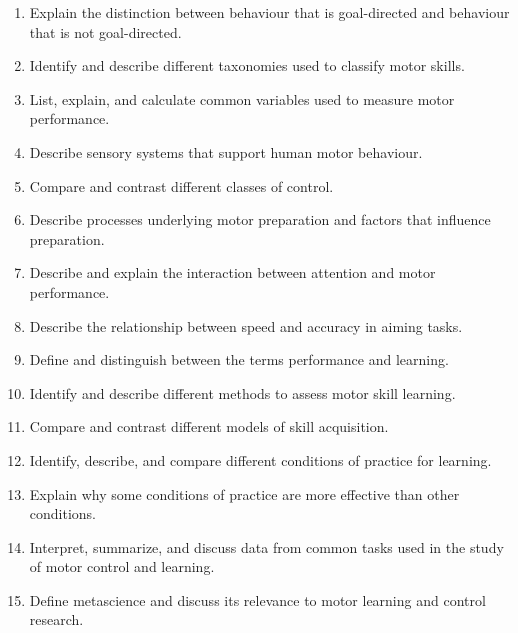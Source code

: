 \documentclass[hidelinks,11pt]{article}
\begin{document}
\vspace{-0.5em}\begin{enumerate}\itemsep0em
  \item Explain the distinction between behaviour that is goal-directed and behaviour that is not goal-directed.
  \item Identify and describe different taxonomies used to classify motor skills.
  \item List, explain, and calculate common variables used to measure motor performance.
  \item Describe sensory systems that support human motor behaviour.
  \item Compare and contrast different classes of control.
  \item Describe processes underlying motor preparation and factors that influence preparation.
  \item Describe and explain the interaction between attention and motor performance.
  \item Describe the relationship between speed and accuracy in aiming tasks.
  \item Define and distinguish between the terms performance and learning.
  \item Identify and describe different methods to assess motor skill learning.
  \item Compare and contrast different models of skill acquisition.
  \item Identify, describe, and compare different conditions of practice for learning.
  \item Explain why some conditions of practice are more effective than other conditions.
  \item Interpret, summarize, and discuss data from common tasks used in the study of motor control and learning.
  \item Define metascience and discuss its relevance to motor learning and control research.
\end{enumerate}
\end{document}
